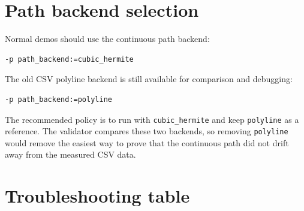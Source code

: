 \documentclass[12pt,a4paper]{report}
\begin{document}
\section{Path backend selection}

Normal demos should use the continuous path backend:

\begin{lstlisting}[style=terminalcode]
-p path_backend:=cubic_hermite
\end{lstlisting}

The old CSV polyline backend is still available for comparison and debugging:

\begin{lstlisting}[style=terminalcode]
-p path_backend:=polyline
\end{lstlisting}

The recommended policy is to run with \texttt{cubic\_hermite} and keep
\texttt{polyline} as a reference. The validator compares these two backends, so
removing \texttt{polyline} would remove the easiest way to prove that the
continuous path did not drift away from the measured CSV data.

\section{Troubleshooting table}
\end{document}
